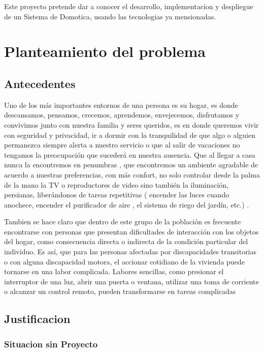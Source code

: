 \documentclass[letterpaper,12pt]{article}
\begin{document}
{		Este proyecto pretende dar a conocer el desarrollo, implementacion  y despliegue de un Sistema de Domotica, usando las tecnologias ya mensionadas.
		
		
		\section{Planteamiento del problema}
		\subsection{Antecedentes}
		
		Uno de los más importantes entornos de una persona es su hogar, es donde  descansamos,  pensamos, crecemos, aprendemos,  envejecemos, disfrutamos y convivimos  junto con nuestra familia y seres queridos, es en donde queremos  vivir con seguridad y privacidad, ir  a dormir  con la tranquilidad de que algo o alguien permanezca siempre alerta a nuestro servicio o que al  salir de vacaciones no tengamos la preocupación que sucederá en nuestra ausencia.  Que al llegar a casa  nunca la encontremos en penumbras , que  encontremos un ambiente agradable de acuerdo a nuestras preferencias,  con más confort,    no solo controlar desde la palma de la mano la TV o reproductores de video  sino también  la iluminación, persianas, liberándonos de tareas repetitivas ( encender las luces cuando anochece,  encender el  purificador de aire , el sistema de riego del jardín, etc.) .
		
		Tambien se hace claro que dentro de este grupo de la población es frecuente encontrarse con personas que presentan  dificultades de interacción con los objetos del hogar, como consecuencia directa o indirecta de la condición particular del individuo. Es así, que para las personas afectadas por discapacidades transitorias  o  con alguna discapacidad motora, el accionar cotidiano de la vivienda puede tornarse en una labor complicada. Labores sencillas, como presionar el interruptor de una luz, abrir una puerta o ventana, utilizar una toma de corriente o alcanzar un control remoto, pueden transformarse en tareas complicadas 
		
		
		
		
		\subsection{Justificacion}
		
		\subsubsection{Situacion sin Proyecto}
		
}
\end{document}
